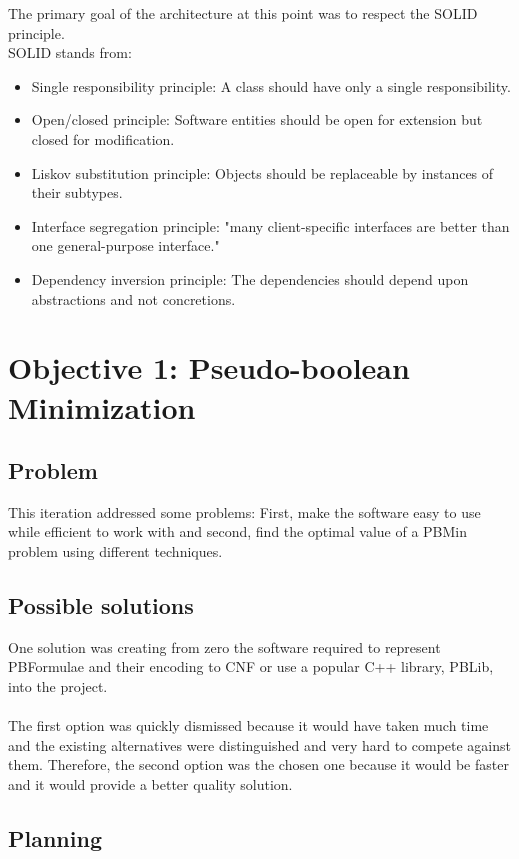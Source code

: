 The primary goal of the architecture at this point was to respect the SOLID principle.  \\
SOLID stands from:\cite{Martin} 
\begin{itemize}
	\item Single responsibility principle: A class should have only a single responsibility.  
	\item Open/closed principle: Software entities should be open for extension but closed for modification. 
	\item Liskov substitution principle: Objects should be replaceable by instances of their subtypes.  
	\item Interface segregation principle: "many client-specific interfaces are better than one general-purpose interface."
	\item Dependency inversion principle: The dependencies should depend upon abstractions and not concretions.
\end{itemize}

\section{Objective 1: Pseudo-boolean Minimization}

\subsection{Problem}
This iteration addressed some problems: First, make the software easy to use while efficient to work with and second, find the optimal value of a PBMin problem using different techniques.  

\subsection{Possible solutions}
One solution was creating from zero the software required to represent PBFormulae and their encoding to CNF or use a popular C++ library, PBLib, into the project. \\\\
The first option was quickly dismissed because it would have taken much time and the existing alternatives were distinguished and very hard to compete against them. Therefore, the second option was the chosen one because it would be faster and it would provide a better quality solution. 


\subsection{Planning}

